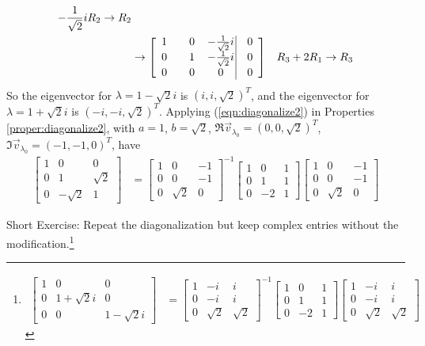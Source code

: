 \begin{solution}
\begin{align*}
\begin{aligned}
-\frac{1}{\sqrt{2}}i R_2 &\to R_2 \\
\end{aligned} \\
&\to  
\left[\begin{array}{@{}wc{15pt}wc{15pt}wc{17pt}|wc{15pt}@{}}
1 & 0 & -\frac{1}{\sqrt{2}}i & 0 \\
0 & 1 & -\frac{1}{\sqrt{2}}i & 0 \\
0 & 0 & 0 & 0
\end{array}\right] & R_3 + 2R_1 \to R_3 
\end{align*}
So the eigenvector for $\lambda = 1 - \sqrt{2}i$ is $(i, i, \sqrt{2})^T$, and the eigenvector for $\lambda = 1 + \sqrt{2}i$ is $(-i, -i, \sqrt{2})^T$. Applying (\ref{eqn:diagonalize2}) in Properties \ref{proper:diagonalize2}, with $a = 1$, $b = \sqrt{2}$, $\Re{\vec{v}_{\lambda_0}} = (0,0,\sqrt{2})^T$, $\Im{\vec{v}_{\lambda_0}} = (-1,-1,0)^T$, have
\begin{align*}
\begin{bmatrix}
1 & 0 & 0 \\
0 & 1 & \sqrt{2} \\
0 & -\sqrt{2} & 1
\end{bmatrix}
&= 
\begin{bmatrix}
1 & 0 & -1 \\
0 & 0 & -1 \\
0 & \sqrt{2} & 0 
\end{bmatrix}^{-1}
\begin{bmatrix}
1 & 0 & 1 \\
0 & 1 & 1 \\
0 & -2 & 1
\end{bmatrix}
\begin{bmatrix}
1 & 0 & -1 \\
0 & 0 & -1 \\
0 & \sqrt{2} & 0 
\end{bmatrix}
\end{align*}
\end{solution}
Short Exercise: Repeat the diagonalization but keep complex entries without the modification.\footnote{
\begin{align*}
\begin{bmatrix}
1 & 0 & 0 \\
0 & 1+\sqrt{2}i & 0 \\
0 & 0 & 1-\sqrt{2}i
\end{bmatrix}
&= 
\begin{bmatrix}
1 & -i & i \\
0 & -i & i \\
0 & \sqrt{2} & \sqrt{2} 
\end{bmatrix}^{-1}
\begin{bmatrix}
1 & 0 & 1 \\
0 & 1 & 1 \\
0 & -2 & 1
\end{bmatrix}
\begin{bmatrix}
1 & -i & i \\
0 & -i & i \\
0 & \sqrt{2} & \sqrt{2} 
\end{bmatrix}   
\end{align*}}

